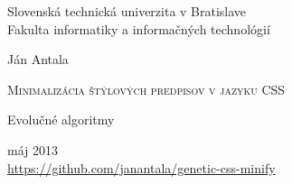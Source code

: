 

\setlength{\parindent}{0cm}

\thispagestyle{empty}

\begin{center}
\begin{LARGE}
\textmd{
Slovenská technická univerzita v Bratislave\\
\vspace*{0.2cm}
Fakulta informatiky a informačných technológií  
}
\end{LARGE}

\vspace*{1.0cm}
\begin{Large}
\end{Large}

\end{center}

\vspace{5.5cm}

\begin{center}
{\Large \textmd{{Ján Antala}}}
\end{center}

\vspace{0.1cm}
\begin{huge}
\begin{center}
\textsc{Minimalizácia štýlových predpisov v jazyku CSS}
\end{center}
\end{huge}

\vspace{0.5cm}
\begin{center}
{\Large{\textmd{Evolučné algoritmy}}}\\
\end{center}

\vspace{5.5cm}

\begin{flushleft}

\large{máj 2013} \\
\large{\url{https://github.com/janantala/genetic-css-minify}}
\end{flushleft}


\newpage


\pagebreak

\newpage
\setcounter{page}{1}
\thispagestyle{empty}

\setcounter{tocdepth}{3}
\tableofcontents
\listoffigures 

\thispagestyle{empty}
\thispagestyle{empty}


\newpage
